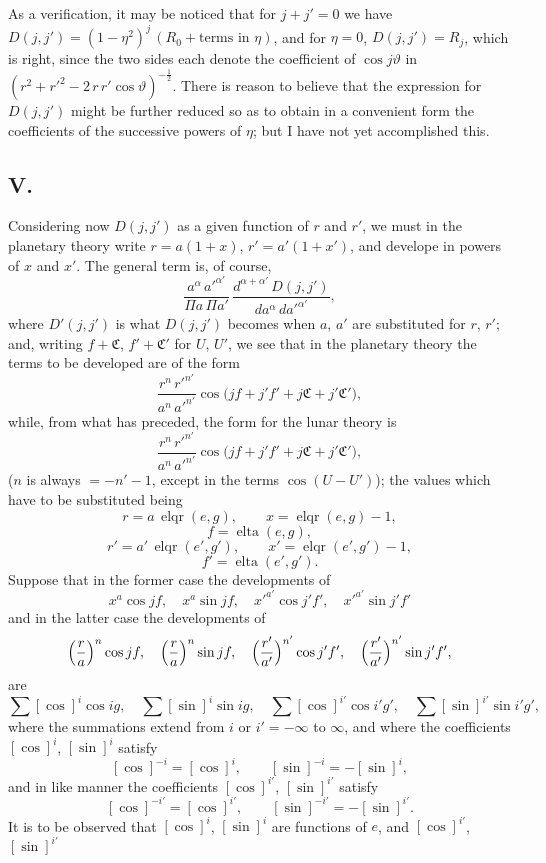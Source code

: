 \documentclass[12pt,a4paper]{article}
\providecommand{\elqr}{\mathop{\mathrm{elqr}}}
\providecommand{\elta}{\mathop{\mathrm{elta}}}
\theoremstyle{plain}
\begin{document}
\medskip
\noindent As a verification, it may be noticed that for $j+j'=0$ we have $D(j,j')=(1-\eta^{2})^{j}\,(R_{0}+\text{terms in }\eta)$, and for $\eta=0$, $D(j,j')=R_{j}$, which is right, since the two sides each denote the coefficient of $\cos j\vartheta$ in $(r^{2}+r'^{2}-2\,r\,r'\cos\vartheta)^{-\tfrac{1}{2}}$. There is reason to believe that the expression for $D(j,j')$ might be further reduced so as to obtain in a convenient form the coefficients of the successive powers of $\eta$; but I have not yet accomplished this.

\newpage
\subsection*{V.}
 Considering now $D(j,j')$ as a given function of $r$ and $r'$, we must in the planetary theory write $r=a(1+x)$, $r'=a'(1+x')$, and develope in powers of $x$ and $x'$. The general term is, of course,
\[
\dfrac{a^{\alpha}\,a'^{\alpha'}}{\Pi a\,\Pi a'}\,\dfrac{d^{\alpha+\alpha'}\,D(j,j')}{da^{\alpha}\,da'^{\alpha'}},
\]
where $D'(j,j')$ is what $D(j,j')$ becomes when $a$, $a'$ are substituted for $r$, $r'$; and, writing $f+\mathfrak{C}$, $f'+\mathfrak{C}'$ for $U$, $U'$, we see that in the planetary theory the terms to be developed are of the form
\[
\dfrac{r^{n}\,r'^{n'}}{a^{n}\,a'^{n'}}\cos\bigl(jf+j'f'+j\mathfrak{C}+j'\mathfrak{C}'\bigr),
\]
while, from what has preceded, the form for the lunar theory is
\[
\dfrac{r^{n}\,r'^{n'}}{a^{n}\,a'^{n'}}\cos\bigl(jf+j'f'+j\mathfrak{C}+j'\mathfrak{C}'\bigr),
\]
($n$ is always $=-n'-1$, except in the terms $\cos(U-U')$); the values which have to be substituted being
\[
r=a\,\elqr(e,g),\qquad x=\elqr(e,g)-1,
\]
\[
f=\elta(e,g),
\]
\[
r'=a'\,\elqr(e',g'),\qquad x'=\elqr(e',g')-1,
\]
\[
f'=\elta(e',g').
\]
Suppose that in the former case the developments of
\[
x^{a}\cos jf,\quad x^{a}\sin jf,\quad x'^{a'}\cos j'f',\quad x'^{a'}\sin j'f'
\]
and in the latter case the developments of
\[
\Bigl(\dfrac{r}{a}\Bigr)^{n}\cos jf,\quad \Bigl(\dfrac{r}{a}\Bigr)^{n}\sin jf,\quad \Bigl(\dfrac{r'}{a'}\Bigr)^{n'}\cos j'f',\quad \Bigl(\dfrac{r'}{a'}\Bigr)^{n'}\sin j'f',
\]
are
\[
\sum[\cos]^{i}\cos ig,\quad \sum[\sin]^{i}\sin ig,\quad \sum[\cos]^{i'}\cos i'g',\quad \sum[\sin]^{i'}\sin i'g',
\]
where the summations extend from $i$ or $i'=-\infty$ to $\infty$, and where the coefficients $[\cos]^{i}$, $[\sin]^{i}$ satisfy
\[
[\cos]^{-i}=[\cos]^{i},\qquad [\sin]^{-i}=-[\sin]^{i},
\]
and in like manner the coefficients $[\cos]^{i'}$, $[\sin]^{i'}$ satisfy
\[
[\cos]^{-i'}=[\cos]^{i'},\qquad [\sin]^{-i'}=-[\sin]^{i'}.
\]
It is to be observed that $[\cos]^{i}$, $[\sin]^{i}$ are functions of $e$, and $[\cos]^{i'}$, $[\sin]^{i'}$
\end{document}
